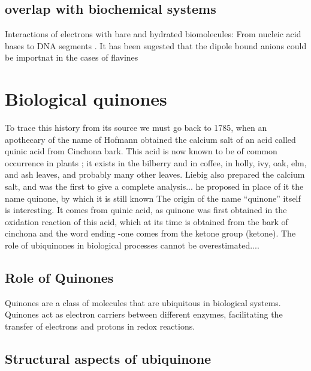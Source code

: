 \subsection{overlap with biochemical systems}
Interactions of electrons with bare and hydrated biomolecules: From nucleic acid bases to DNA segments \cite{gu2012interactions}. 
It has been sugested that the dipole bound anions could be importnat in the cases of flavines \cite{matthews2018observation}

\section{Biological quinones}
To trace this history from its source we must go back to 1785, when an apothecary of the name of Hofmann obtained the calcium salt of an acid called quinic acid from Cinchona bark. This acid is now known to be of common occurrence in plants ; it exists in the bilberry and in coffee, in holly, ivy, oak, elm, and ash leaves, and probably many other leaves. Liebig also prepared the calcium salt, and was the first to give a complete analysis... he proposed in place of it the name quinone, by which it is still known
The origin of the name “quinone” itself is interesting. It comes from quinic acid, as quinone was first obtained in the oxidation reaction of this acid, which at its time is obtained from the bark of cinchona and the word ending -one comes from the ketone group (ketone)\cite{chen2024low,rusell1873quinone}. 
The role of ubiquinones in biological processes cannot be overestimated...\cite{ernster1995biochemical}.

\subsection{Role of Quinones}
Quinones are a class of molecules that are ubiquitous in biological systems. Quinones act as electron carriers between different enzymes, facilitating the transfer of electrons and protons in redox reactions. 

\subsection{Structural aspects of ubiquinone}

